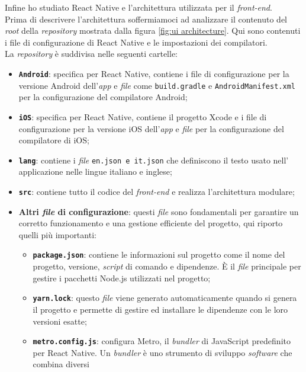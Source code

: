 Infine ho studiato React Native e l'architettura utilizzata per il \textit{front-end}.\\
Prima di descrivere l'architettura soffermiamoci ad analizzare il contenuto del \textit{root} della \textit{repository} 
mostrata dalla figura \ref{fig:ui architecture}.
Qui sono contenuti i file di configurazione di React Native e le impostazioni dei compilatori.\\
La \textit{repository} è suddivisa nelle seguenti cartelle:
\begin{itemize}
    \item \texttt{\textbf{Android}}: specifica per React Native, contiene i file di configurazione 
          per la versione Android dell'\textit{app} e \textit{file} come \texttt{build.gradle} e \texttt{AndroidManifest.xml} 
          per la configurazione del compilatore Android;
    \item \texttt{\textbf{iOS}}: specifica per React Native, contiene il progetto Xcode e i file di configurazione 
          per la versione iOS dell'\textit{app} e \textit{file} per la configurazione del compilatore di iOS;
    \item \texttt{\textbf{lang}}: contiene i \textit{file} \texttt{en.json e it.json} che definiscono il testo usato nell'
          applicazione nelle lingue italiano e inglese;
    \item \texttt{\textbf{src}}: contiene tutto il codice del \textit{front-end} e realizza l'architettura modulare;
    \item \textbf{Altri \textit{file} di configurazione}: questi \textit{file} sono fondamentali 
          per garantire un corretto funzionamento e una gestione efficiente del progetto, qui riporto quelli più importanti:
          \begin{itemize}
            \item \textbf{\texttt{package.json}}: contiene le informazioni sul progetto come il nome del progetto, versione,
                  \textit{script} di comando e dipendenze. È il \textit{file} principale per gestire i pacchetti Node.js utilizzati nel progetto;
            \item \textbf{\texttt{yarn.lock}}: questo \textit{file} viene generato automaticamente quando si genera il progetto e 
                  permette di gestire ed installare le dipendenze con le loro versioni esatte;
            \item \textbf{\texttt{metro.config.js}}: configura Metro, il \textit{bundler} di JavaScript predefinito 
                  per React Native. Un \textit{bundler} è uno strumento di sviluppo \textit{software} che combina diversi 

\end{itemize}
\end{itemize}
